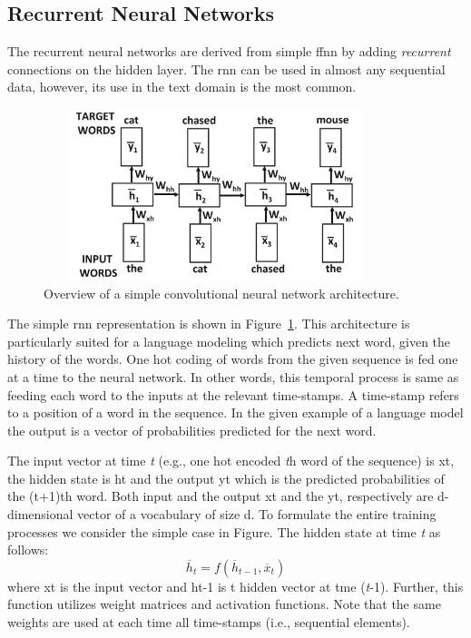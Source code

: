 \subsection{Recurrent Neural Networks}
The recurrent neural networks are derived from  simple ffnn by adding \textit{recurrent} connections on the hidden layer. The rnn can be used in almost any sequential data, however, its use in the text domain is the most common.  
\begin{figure}[h]
\centering
 \includegraphics[height=5cm, width=10cm]{Figures/fig_rnn.png}
 \caption{Overview of a simple convolutional neural network architecture.}
 \label{fig:rnn}
\end{figure}
The simple rnn representation is shown in Figure~\ref{fig:rnn}. This architecture is particularly suited for a language modeling which predicts next word, given the history of the words. One hot coding of words from the given sequence is fed one at a time to the neural network. In other words, this temporal process is same as feeding each word to the inputs at the relevant time-stamps. A time-stamp refers to a position of a word in the sequence. In the given example of a language model the output is a vector of probabilities predicted for the next word. %

The input vector at time \textit{t} (e.g., one hot encoded \textit{t}h word of the sequence) is xt, the hidden state is ht and the output yt which is the predicted probabilities of the (t+1)th word. Both input and the output xt and the yt, respectively are d-dimensional vector of a vocabulary of size d. To formulate the entire training processes we consider the simple case in Figure. The hidden state at time \textit{t} as follows:
    \begin{equation}
    \overline{h}_t = f(\overline{h}_{t-1},\overline{x}_{t})
\end{equation}
where xt is the input vector and ht-1 is t hidden vector at tme (\textit{t}-1). Further, this function utilizes weight matrices and activation functions. Note that the same weights are used at each time all time-stamps (i.e., sequential elements). 

